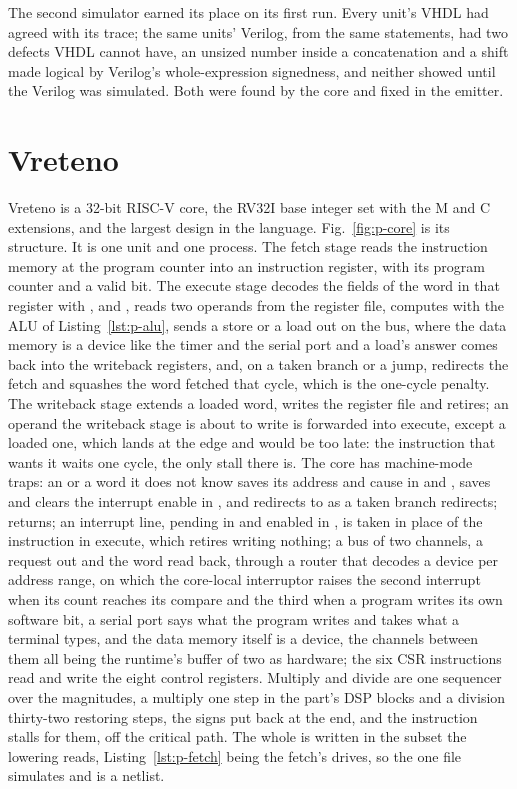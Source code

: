 \documentclass[journal,9pt]{IEEEtran}
\begin{document}
The second simulator earned its place on its first run. Every unit's
VHDL had agreed with its trace; the same units' Verilog, from the
same statements, had two defects VHDL cannot have, an unsized number
inside a concatenation and a shift made logical by Verilog's
whole-expression signedness, and neither showed until the Verilog was
simulated. Both were found by the core and fixed in the emitter.

\section{Vreteno}
\label{sec:p-vreteno}

Vreteno is a 32-bit RISC-V core, the RV32I base integer set with the
M and C extensions, and the largest design in the language. Fig.~\ref{fig:p-core} is its
structure. It is one unit and one process. The fetch stage reads the
instruction memory at the program counter into an instruction
register, with its program counter and a valid bit. The execute stage
decodes the fields of the word in that register with ,
 and , reads two operands from the register
file, computes with the ALU of Listing~\ref{lst:p-alu}, sends a
store or a load out on the bus, where the data memory is a device
like the timer and the serial port and a load's answer comes back
into the writeback registers, and, on a taken branch or a jump,
redirects the fetch
and squashes the word fetched that cycle, which is the one-cycle
penalty. The writeback stage extends a loaded word, writes the
register file and retires; an operand the writeback stage is about
to write is forwarded into execute, except a loaded one, which lands
at the edge and would be too late: the instruction that wants it
waits one cycle, the only stall there is. The core
has machine-mode traps: an  or a word it does not know
saves its address and cause in  and ,
saves and clears the interrupt enable in , and
redirects to  as a taken branch redirects; 
returns; an interrupt line, pending in  and enabled in
, is taken in place of the instruction in execute, which
retires writing nothing; a bus of two channels, a request out and
the word read back, through a router that decodes a device per
address range, on which the core-local interruptor raises the second
interrupt when its count reaches its compare and the third when a
program writes its own software bit, a serial port says what the program writes and takes what
a terminal types, and the data memory itself is a device, the
channels between them all being the runtime's buffer of two as
hardware; the six CSR instructions read and write the
eight control registers. Multiply and divide are one sequencer over
the
magnitudes, a multiply one step in the part's DSP blocks and a
division thirty-two restoring steps, the signs put back at the end,
and the instruction stalls for them, off the critical path. The whole is written in the subset the
lowering reads,
Listing~\ref{lst:p-fetch} being the fetch's drives, so the one file
simulates and is a netlist.
\end{document}
